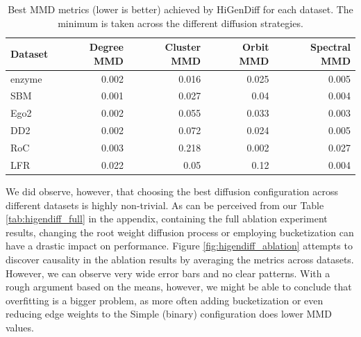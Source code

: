 \begin{table}[H]
    \centering
        \caption[Best MMD metrics achieved by HiGenDiff for each dataset.]{Best MMD metrics (lower is better) achieved by HiGenDiff for each dataset. The minimum is taken across the different diffusion strategies.}
    \label{tab:higendiff_best}
\begin{tabular}{lrrrr}
\toprule
Dataset & Degree MMD & Cluster MMD & Orbit MMD & Spectral MMD \\
\midrule
enzyme & 0.002 & 0.016 & 0.025 & 0.005 \\
SBM & 0.001 & 0.027 & 0.04 & 0.004 \\
Ego2 & 0.002 & 0.055 & 0.033 & 0.003 \\
DD2 & 0.002 & 0.072 & 0.024 & 0.005 \\
RoC & 0.003 & 0.218 & 0.002 & 0.027 \\
LFR & 0.022 & 0.05 & 0.12 & 0.004 \\
\bottomrule
\end{tabular}
\end{table}

We did observe, however, that choosing the best diffusion configuration across different datasets is highly non-trivial. As can be perceived from our Table \ref{tab:higendiff_full} in the appendix, containing the full ablation experiment results, changing the root weight diffusion process or employing bucketization can have a drastic impact on performance. Figure \ref{fig:higendiff_ablation} attempts to discover causality in the ablation results by averaging the metrics across datasets. However, we can observe very wide error bars and no clear patterns. With a rough argument based on the means, however, we might be able to conclude that overfitting is a bigger problem, as more often adding bucketization or even reducing edge weights to the Simple (binary) configuration does lower MMD values.

